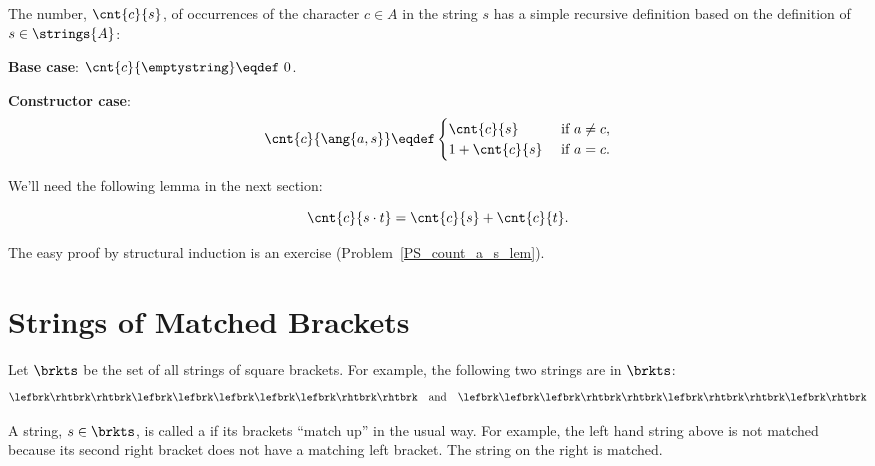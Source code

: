 The number, $\cnt{c}{s}$, of occurrences of the character $c \in A$ in
the string $s$ has a simple recursive definition based on the
definition of $s \in \strings{A}$:
\begin{definition}\label{countas_def}

\textbf{Base case}: $\cnt{c}{\emptystring} \eqdef\ 0$.

\textbf{Constructor case}:
\[
\cnt{c}{\ang{a,s}} \eqdef \begin{cases}
                           \cnt{c}{s}  &\text{ if } a \neq c,\\
                           1 + \cnt{c}{s} &\text{ if } a = c.
                           \end{cases}
\]

\end{definition}

We'll need the following lemma in the next section:
\begin{lemma}\label{countas_lem}
\[
\cnt{c}{s \cdot t} = \cnt{c}{s} + \cnt{c}{t}.
\]
\end{lemma}
The easy proof by structural induction is an exercise
(Problem~\ref{PS_count_a_s_lem}).

\begin{problems}
\classproblems
{}

\homeworkproblems
{}
\end{problems}

\section{Strings of Matched Brackets}

Let $\brkts$ be the set of all strings of square brackets.  For example,
the following two strings are in $\brkts$:
\begin{equation}\label{2strings}
\lefbrk\rhtbrk\rhtbrk\lefbrk\lefbrk\lefbrk\lefbrk\lefbrk\rhtbrk\rhtbrk\quad \text{and}\quad \lefbrk\lefbrk\lefbrk\rhtbrk\rhtbrk\lefbrk\rhtbrk\rhtbrk\lefbrk\rhtbrk
\end{equation}

A string, $s \in \brkts$, is called a  if its
brackets ``match up'' in the usual way.  For example, the left hand
string above is not matched because its second right bracket does not
have a matching left bracket.  The string on the right is matched.

